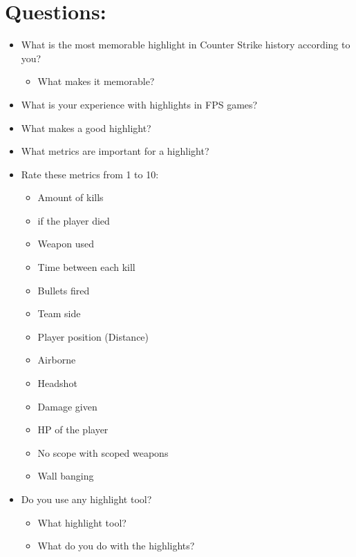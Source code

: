 \documentclass[a4paper,twoside]{bth}
\begin{document}
\section{Questions:}
\normalsize
\begin{itemize}
    \item What is the most memorable highlight in Counter Strike history according to you? 
    \begin{itemize}
        \item What makes it memorable?
    \end{itemize}
    \item What is your experience with highlights in FPS games?
    \item What makes a good highlight?
    \item What metrics are important for a highlight?
    \item Rate these metrics from 1 to 10:
        \begin{itemize}
        \item Amount of kills 
        \item if the player died
        \item Weapon used 
        \item Time between each kill
        \item Bullets fired
        \item Team side
        \item Player position (Distance)
        \item Airborne 
        \item Headshot
        \item Damage given
        \item HP of the player
        \item No scope with scoped weapons
        \item Wall banging
    \end{itemize}
    \item Do you use any highlight tool?
    \begin{itemize}
        \item What highlight tool?
        \item What do you do with the highlights?
    \end{itemize}

    
\end{itemize}
\end{document}
